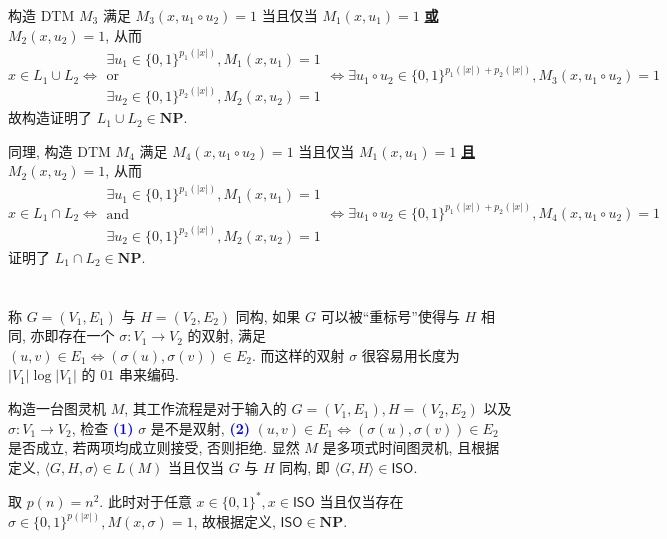 \documentclass[8pt]{article}
\theoremstyle{compact}
\def\obj#1{\textbf{\uline{#1}}}
\def\num#1{\textnormal{\textbf{\mbox{\textcolor{blue}{(#1)}}}}}
\begin{document}
构造 DTM $M_3$ 满足 $M_3(x, u_1 \circ u_2) = 1$ 当且仅当 $M_1(x, u_1) = 1$ \obj{或} $M_2(x, u_2) = 1$, 从而
$$x \in L_1 \cup L_2 \Leftrightarrow \begin{matrix}
	\exists u_1 \in \{0, 1\}^{p_1(|x|)}, M_1(x, u_1) = 1\\
	\text{or}\\
	\exists u_2 \in \{0, 1\}^{p_2(|x|)}, M_2(x, u_2) = 1
\end{matrix} \Leftrightarrow \exists u_1 \circ u_2 \in \{0, 1\}^{p_1(|x|) + p_2(|x|)}, M_3(x, u_1 \circ u_2) = 1$$
故构造证明了 $L_1 \cup L_2 \in \mathbf{NP}$.

同理, 构造 DTM $M_4$ 满足 $M_4(x, u_1 \circ u_2) = 1$ 当且仅当 $M_1(x, u_1) = 1$ \obj{且} $M_2(x, u_2) = 1$, 从而
$$x \in L_1 \cap L_2 \Leftrightarrow \begin{matrix}
	\exists u_1 \in \{0, 1\}^{p_1(|x|)}, M_1(x, u_1) = 1\\
	\text{and}\\
	\exists u_2 \in \{0, 1\}^{p_2(|x|)}, M_2(x, u_2) = 1
\end{matrix} \Leftrightarrow \exists u_1 \circ u_2 \in \{0, 1\}^{p_1(|x|) + p_2(|x|)}, M_4(x, u_1 \circ u_2) = 1$$
证明了 $L_1 \cap L_2 \in \mathbf{NP}$.

\section{}
称 $G = (V_1, E_1)$ 与 $H = (V_2, E_2)$ 同构, 如果 $G$ 可以被“重标号”使得与 $H$ 相同, 亦即存在一个 $\sigma: V_1 \to V_2$ 的双射, 满足 $(u, v) \in E_1 \Leftrightarrow (\sigma(u), \sigma(v)) \in E_2$. 而这样的双射 $\sigma$ 很容易用长度为 $|V_1| \log |V_1|$ 的 $01$ 串来编码.

构造一台图灵机 $M$, 其工作流程是对于输入的 $G = (V_1, E_1), H = (V_2, E_2)$ 以及 $\sigma: V_1 \to V_2$, 检查 \num{1} $\sigma$ 是不是双射, \num{2} $(u, v) \in E_1 \Leftrightarrow (\sigma(u), \sigma(v)) \in E_2$ 是否成立, 若两项均成立则接受, 否则拒绝. 显然 $M$ 是多项式时间图灵机, 且根据定义, $\langle G, H, \sigma \rangle \in L(M)$ 当且仅当 $G$ 与 $H$ 同构, 即 $\langle G, H \rangle \in \textsf{ISO}$.

取 $p(n) = n^2$. 此时对于任意 $x \in \{0, 1\}^*, x \in \textsf{ISO}$ 当且仅当存在 $\sigma \in \{0, 1\}^{p(|x|)}, M(x, \sigma) = 1$, 故根据定义, $\textsf{ISO} \in \mathbf{NP}$.

\section{}
\end{document}
